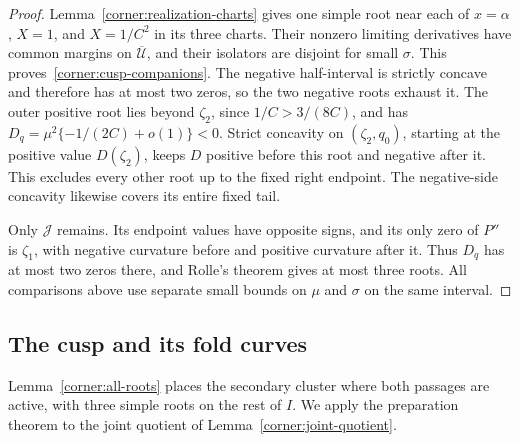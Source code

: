 \begin{proof}
Lemma~\ref{corner:realization-charts} gives one simple root near each
of $x=\alpha$, $X=1$, and $X=1/C^2$ in its three charts. Their
nonzero limiting derivatives have common margins on
$\overline{\mathcal U}$, and their isolators are disjoint for small
$\sigma$. This proves~\eqref{corner:cusp-companions}.
The negative half-interval is strictly concave and therefore has at most
two zeros, so the two negative roots exhaust it. The outer positive
root lies beyond $\zeta_2$, since $1/C>3/(8C)$, and has
$D_q=\mu^2\{-1/(2C)+o(1)\}<0$. Strict concavity on $(\zeta_2,q_0)$,
starting at the positive value $D(\zeta_2)$, keeps $D$ positive before
this root and negative after it. This excludes every other root up
to the fixed right endpoint. The negative-side concavity likewise
covers its entire fixed tail.

Only $\mathcal J$ remains. Its endpoint values have opposite signs,
and its only zero of $P''$ is $\zeta_1$, with negative curvature before
and positive curvature after it. Thus $D_q$ has at most two zeros there,
and Rolle's theorem gives at most three roots. All comparisons above
use separate small bounds on $\mu$ and $\sigma$ on the same interval.
\end{proof}

\subsection{The cusp and its fold curves}

Lemma~\ref{corner:all-roots} places the secondary cluster where both passages
are active, with three simple roots on the rest of $I$. We apply the
preparation theorem to the joint quotient of
Lemma~\ref{corner:joint-quotient}.

